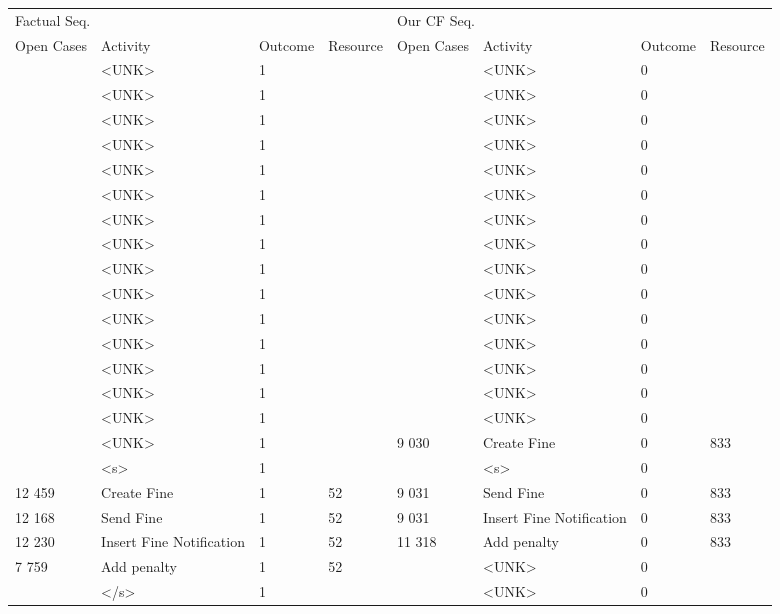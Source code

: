 \begin{tabular}{llllllll}
\toprule
\multicolumn{4}{l}{Factual Seq.} & \multicolumn{4}{l}{Our CF Seq.} \\
Open Cases & Activity & Outcome & Resource & Open Cases & Activity & Outcome & Resource \\
\midrule
 & <UNK> & 1 &  &  & <UNK> & 0 &  \\
 & <UNK> & 1 &  &  & <UNK> & 0 &  \\
 & <UNK> & 1 &  &  & <UNK> & 0 &  \\
 & <UNK> & 1 &  &  & <UNK> & 0 &  \\
 & <UNK> & 1 &  &  & <UNK> & 0 &  \\
 & <UNK> & 1 &  &  & <UNK> & 0 &  \\
 & <UNK> & 1 &  &  & <UNK> & 0 &  \\
 & <UNK> & 1 &  &  & <UNK> & 0 &  \\
 & <UNK> & 1 &  &  & <UNK> & 0 &  \\
 & <UNK> & 1 &  &  & <UNK> & 0 &  \\
 & <UNK> & 1 &  &  & <UNK> & 0 &  \\
 & <UNK> & 1 &  &  & <UNK> & 0 &  \\
 & <UNK> & 1 &  &  & <UNK> & 0 &  \\
 & <UNK> & 1 &  &  & <UNK> & 0 &  \\
 & <UNK> & 1 &  &  & <UNK> & 0 &  \\
 & <UNK> & 1 &  & 9 030 & Create Fine & 0 & 833 \\
 & <s> & 1 &  &  & <s> & 0 &  \\
12 459 & Create Fine & 1 & 52 & 9 031 & Send Fine & 0 & 833 \\
12 168 & Send Fine & 1 & 52 & 9 031 & Insert Fine Notification & 0 & 833 \\
12 230 & Insert Fine Notification & 1 & 52 & 11 318 & Add penalty & 0 & 833 \\
7 759 & Add penalty & 1 & 52 &  & <UNK> & 0 &  \\
 & </s> & 1 &  &  & <UNK> & 0 &  \\
\bottomrule
\end{tabular}
